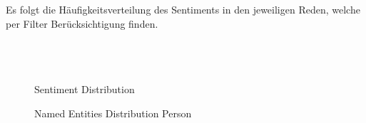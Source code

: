 \documentclass[10pt]{report}
\begin{document}
\noindent Es folgt die Häufigkeitsverteilung des Sentiments in den jeweiligen Reden, welche per Filter Berücksichtigung finden. \\\\\\\\
\begin{figure}[H]
	\begin{center}		
  	 \end{center}
	\caption{Sentiment  Distribution}	
 \end{figure}



\begin{figure}[H]
	\begin{center}		
  	 \end{center}
	\caption{Named Entities Distribution Person}	
 \end{figure}
\end{document}
